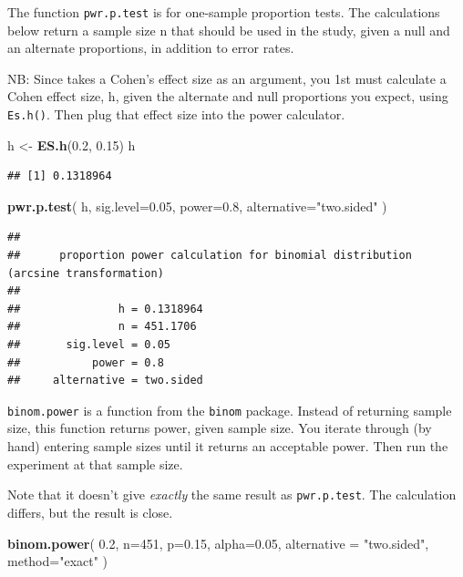 \documentclass[]{book}
\newenvironment{Shaded}{\begin{snugshade}}{\end{snugshade}}
\newcommand{\DataTypeTok}[1]{\textcolor[rgb]{0.13,0.29,0.53}{#1}}
\newcommand{\DecValTok}[1]{\textcolor[rgb]{0.00,0.00,0.81}{#1}}
\newcommand{\FloatTok}[1]{\textcolor[rgb]{0.00,0.00,0.81}{#1}}
\newcommand{\KeywordTok}[1]{\textcolor[rgb]{0.13,0.29,0.53}{\textbf{#1}}}
\newcommand{\NormalTok}[1]{#1}
\newcommand{\StringTok}[1]{\textcolor[rgb]{0.31,0.60,0.02}{#1}}
\begin{document}
The function \texttt{pwr.p.test} is for one-sample proportion tests. The calculations below return a sample size n that should be used in the study, given a null and an alternate proportions, in addition to error rates.

NB: Since takes a Cohen's effect size as an argument, you 1st must calculate a Cohen effect size, h, given the alternate and null proportions you expect, using \texttt{Es.h()}. Then plug that effect size into the power calculator.

\begin{Shaded}
\begin{Highlighting}[]
\NormalTok{h <-}\StringTok{ }\KeywordTok{ES.h}\NormalTok{(}\FloatTok{0.2}\NormalTok{, }\FloatTok{0.15}\NormalTok{)}
\NormalTok{h}
\end{Highlighting}
\end{Shaded}

\begin{verbatim}
## [1] 0.1318964
\end{verbatim}

\begin{Shaded}
\begin{Highlighting}[]
\KeywordTok{pwr.p.test}\NormalTok{(}
\NormalTok{  h, }
  \DataTypeTok{sig.level=}\FloatTok{0.05}\NormalTok{, }
  \DataTypeTok{power=}\FloatTok{0.8}\NormalTok{, }
  \DataTypeTok{alternative=}\StringTok{"two.sided"}
\NormalTok{  )}
\end{Highlighting}
\end{Shaded}

\begin{verbatim}
## 
##      proportion power calculation for binomial distribution (arcsine transformation) 
## 
##               h = 0.1318964
##               n = 451.1706
##       sig.level = 0.05
##           power = 0.8
##     alternative = two.sided
\end{verbatim}

\texttt{binom.power} is a function from the \texttt{binom} package. Instead of returning sample size, this function returns power, given sample size. You iterate through (by hand) entering sample sizes until it returns an acceptable power. Then run the experiment at that sample size.

Note that it doesn't give \emph{exactly} the same result as \texttt{pwr.p.test}. The calculation differs, but the result is close.

\begin{Shaded}
\begin{Highlighting}[]
\KeywordTok{binom.power}\NormalTok{(}
  \FloatTok{0.2}\NormalTok{, }
  \DataTypeTok{n=}\DecValTok{451}\NormalTok{, }
  \DataTypeTok{p=}\FloatTok{0.15}\NormalTok{, }
  \DataTypeTok{alpha=}\FloatTok{0.05}\NormalTok{, }
  \DataTypeTok{alternative =} \StringTok{"two.sided"}\NormalTok{, }
  \DataTypeTok{method=}\StringTok{"exact"}
\NormalTok{  )}
\end{Highlighting}
\end{Shaded}
\end{document}
